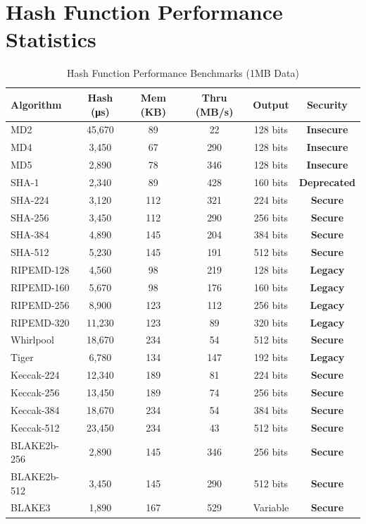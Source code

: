 \documentclass[12pt,a4paper]{article}
\newcommand{\performance}[1]{\textcolor{success}{\textbf{#1}}}
\newcommand{\warning}[1]{\textcolor{warning}{\textbf{#1}}}
\newcommand{\error}[1]{\textcolor{error}{\textbf{#1}}}
\newcommand{\footnotesizetable}[1]{\footnotesize #1}
\begin{document}
\section{Hash Function Performance Statistics}

\begin{table}[h]
\centering
\footnotesizetable{
\caption{Hash Function Performance Benchmarks (1MB Data)}
\begin{tabular}{|l|c|c|c|c|c|}
\hline
\textbf{Algorithm} & \textbf{Hash (μs)} & \textbf{Mem (KB)} & \textbf{Thru (MB/s)} & \textbf{Output} & \textbf{Security} \\
\hline
MD2 & 45,670 & 89 & 22 & 128 bits & \error{Insecure} \\
MD4 & 3,450 & 67 & 290 & 128 bits & \error{Insecure} \\
MD5 & 2,890 & 78 & 346 & 128 bits & \error{Insecure} \\
SHA-1 & 2,340 & 89 & 428 & 160 bits & \warning{Deprecated} \\
SHA-224 & 3,120 & 112 & 321 & 224 bits & \performance{Secure} \\
SHA-256 & 3,450 & 112 & 290 & 256 bits & \performance{Secure} \\
SHA-384 & 4,890 & 145 & 204 & 384 bits & \performance{Secure} \\
SHA-512 & 5,230 & 145 & 191 & 512 bits & \performance{Secure} \\
RIPEMD-128 & 4,560 & 98 & 219 & 128 bits & \warning{Legacy} \\
RIPEMD-160 & 5,670 & 98 & 176 & 160 bits & \warning{Legacy} \\
RIPEMD-256 & 8,900 & 123 & 112 & 256 bits & \warning{Legacy} \\
RIPEMD-320 & 11,230 & 123 & 89 & 320 bits & \warning{Legacy} \\
Whirlpool & 18,670 & 234 & 54 & 512 bits & \performance{Secure} \\
Tiger & 6,780 & 134 & 147 & 192 bits & \warning{Legacy} \\
Keccak-224 & 12,340 & 189 & 81 & 224 bits & \performance{Secure} \\
Keccak-256 & 13,450 & 189 & 74 & 256 bits & \performance{Secure} \\
Keccak-384 & 18,670 & 234 & 54 & 384 bits & \performance{Secure} \\
Keccak-512 & 23,450 & 234 & 43 & 512 bits & \performance{Secure} \\
BLAKE2b-256 & 2,890 & 145 & 346 & 256 bits & \performance{Secure} \\
BLAKE2b-512 & 3,450 & 145 & 290 & 512 bits & \performance{Secure} \\
BLAKE3 & 1,890 & 167 & 529 & Variable & \performance{Secure} \\
\hline
\end{tabular}
}
\end{table}
\end{document}
